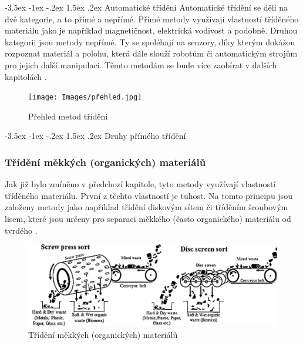 \documentclass[a4paper,10pt]{article}
\makeatletter
\theoremstyle{definition}
\renewcommand\section{\@startsection {section}{1}{\z@}%
                                   {-3.5ex \@plus -1ex \@minus -.2ex}%
                                   {1.5ex \@plus.2ex}%
                                   {\large\bfseries}}
\renewcommand\subsection{\@startsection {subsection}{1}{\z@}%
                                   {-3.5ex \@plus -1ex \@minus -.2ex}%
                                   {1.5ex \@plus.2ex}%
                                   {\normalsize\bfseries}}
\makeatother
\begin{document}
\section{Automatické třídění}
\label{sec:2}
Automatické třídění se dělí na dvě kategorie, a to přímé a nepřímé. Přímé metody využívají vlastností tříděného materiálu jako je například magnetičnost, elektrická vodivost a podobně. Druhou kategorii jsou metody nepřímé. Ty se spoléhají na senzory, díky kterým dokážou rozpoznat materiál a polohu, která dále slouží robotům či automatickým strojům pro jejich další manipulaci. Těmto metodám se bude více zaobírat v dalších kapitolách \cite{GUNDUPALLI201756}.
\begin{figure}[H]
\begin{center}
\texttt{[image: Images/přehled.jpg]}
\caption{Přehled metod třídění \cite{GUNDUPALLI201756}}
\label{fig:1}
\end{center}
\end{figure}

\subsection{Druhy přímého třídění}
\label{subsec:1}
\subsubsection*{Třídění měkkých (organických) materiálů}
Jak již bylo zmíněno v předchozí kapitole, tyto metody využívají vlastností tříděného materiálu. První z těchto vlastností je tuhost. Na tomto principu jsou založeny metody jako například třídění diskovým sítem či tříděním šroubovým lisem, které jsou určeny pro separaci měkkého (často organického) materiálu od tvrdého \cite{GUNDUPALLI201756} \cite{jank2015waste} \cite{hansen2007effects}. \\

\begin{figure}[H]
\begin{center}
\includegraphics[scale=0.2]{Images/Organic.jpg}
\caption{Třídění měkkých (organických) materiálů \cite{inproceedings}}
\label{fig:1}
\end{center}
\end{figure}
\end{document}

